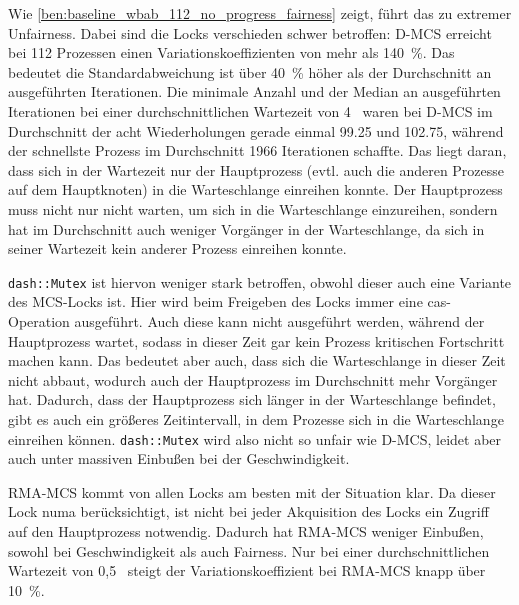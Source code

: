 Wie \autoref{ben:baseline_wbab_112_no_progress_fairness} zeigt,
führt das zu extremer Unfairness.
Dabei sind die Locks verschieden schwer betroffen:
D-MCS erreicht bei 112 Prozessen einen Variationskoeffizienten von mehr als 140~\%.
Das bedeutet die Standardabweichung ist über 40~\% höher als der Durchschnitt an ausgeführten Iterationen.
Die minimale Anzahl und der Median an ausgeführten Iterationen
bei einer durchschnittlichen Wartezeit von 4~
waren bei D-MCS im Durchschnitt der acht Wiederholungen gerade einmal 99.25 und 102.75,
während der schnellste Prozess im Durchschnitt 1966 Iterationen schaffte.
Das liegt daran,
dass sich in der Wartezeit nur der Hauptprozess
(evtl. auch die anderen Prozesse auf dem Hauptknoten)
in die Warteschlange einreihen konnte.
Der Hauptprozess muss nicht nur nicht warten,
um sich in die Warteschlange einzureihen,
sondern hat im Durchschnitt auch weniger Vorgänger in der Warteschlange,
da sich in seiner Wartezeit kein anderer Prozess einreihen konnte.

\texttt{dash::Mutex} ist hiervon weniger stark betroffen,
obwohl dieser auch eine Variante des MCS-Locks ist.
Hier wird beim Freigeben des Locks immer eine \gls{cas}-Operation ausgeführt.
Auch diese kann nicht ausgeführt werden,
während der Hauptprozess wartet,
sodass in dieser Zeit gar kein Prozess kritischen Fortschritt machen kann.
Das bedeutet aber auch,
dass sich die Warteschlange in dieser Zeit nicht abbaut,
wodurch auch der Hauptprozess im Durchschnitt mehr Vorgänger hat.
Dadurch,
dass der Hauptprozess sich länger in der Warteschlange befindet,
gibt es auch ein größeres Zeitintervall,
in dem Prozesse sich in die Warteschlange einreihen können.
\texttt{dash::Mutex} wird also nicht so unfair wie D-MCS,
leidet aber auch unter massiven Einbußen bei der Geschwindigkeit.

RMA-MCS kommt von allen Locks am besten mit der Situation klar.
Da dieser Lock \gls{numa} berücksichtigt,
ist nicht bei jeder Akquisition des Locks ein Zugriff auf den Hauptprozess notwendig.
Dadurch hat RMA-MCS weniger Einbußen,
sowohl bei Geschwindigkeit als auch Fairness.
Nur bei einer durchschnittlichen Wartezeit von 0,5~ steigt der Variationskoeffizient bei RMA-MCS knapp über 10~\%.

